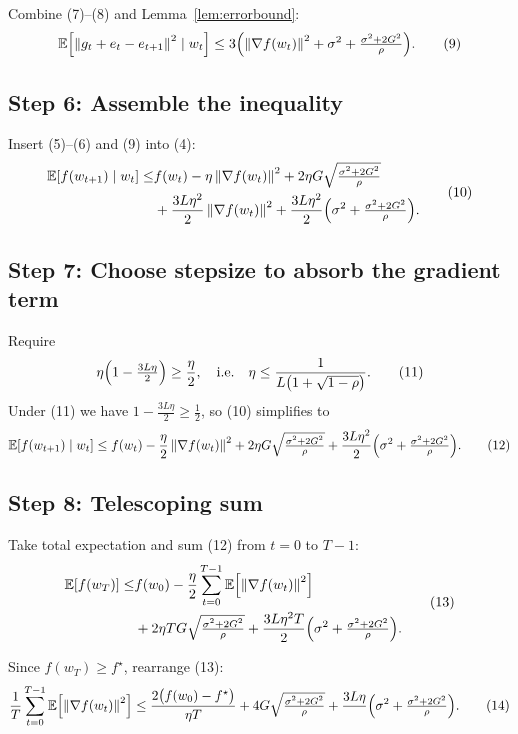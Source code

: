 \documentclass{article}
\newcommand{\EE}{\mathbb{E}}
\newcommand{\norm}[1]{\left\lVert #1 \right\rVert}
\begin{document}
Combine (7)–(8) and Lemma~\ref{lem:errorbound}:
\[
\EE\!\left[\norm{g_t+e_t-e_{t+1}}^{2}\mid w_t\right]
\le 3\Bigl(\norm{\nabla f(w_t)}^{2}+\sigma^{2}
+\tfrac{\sigma^{2}+2G^{2}}{\rho}\Bigr). \tag{9}
\]

\subsection*{Step 6: Assemble the inequality}
Insert (5)–(6) and (9) into (4):
\[
\begin{aligned}
\EE\!\left[f(w_{t+1})\mid w_t\right]
\le&
f(w_t)-\eta\norm{\nabla f(w_t)}^{2}
+2\eta G\sqrt{\tfrac{\sigma^{2}+2G^{2}}{\rho}}\\
&+\frac{3L\eta^{2}}{2}\norm{\nabla f(w_t)}^{2}
+\frac{3L\eta^{2}}{2}\Bigl(\sigma^{2}+\tfrac{\sigma^{2}+2G^{2}}{\rho}\Bigr).
\end{aligned}
\tag{10}
\]

\subsection*{Step 7: Choose stepsize to absorb the gradient term}
Require
\[
\eta\Bigl(1-\tfrac{3L\eta}{2}\Bigr)\ge\frac{\eta}{2},
\quad\text{i.e.}\quad
\eta\le\frac{1}{L\bigl(1+\sqrt{1-\rho}\bigr)}.
\tag{11}
\]
Under (11) we have $1-\frac{3L\eta}{2}\ge\frac{1}{2}$, so (10) simplifies to
\[
\EE\!\left[f(w_{t+1})\mid w_t\right]
\le f(w_t)-\frac{\eta}{2}\norm{\nabla f(w_t)}^{2}
+2\eta G\sqrt{\tfrac{\sigma^{2}+2G^{2}}{\rho}}
+\frac{3L\eta^{2}}{2}\Bigl(\sigma^{2}+\tfrac{\sigma^{2}+2G^{2}}{\rho}\Bigr). \tag{12}
\]

\subsection*{Step 8: Telescoping sum}
Take total expectation and sum (12) from $t=0$ to $T-1$:
\[
\begin{aligned}
\EE[f(w_T)]\le&
f(w_0)-\frac{\eta}{2}\sum_{t=0}^{T-1}\EE\!\left[\norm{\nabla f(w_t)}^{2}\right] \\
&+2\eta T G\sqrt{\tfrac{\sigma^{2}+2G^{2}}{\rho}}
+\frac{3L\eta^{2}T}{2}\Bigl(\sigma^{2}+\tfrac{\sigma^{2}+2G^{2}}{\rho}\Bigr).
\end{aligned}
\tag{13}
\]

Since $f(w_T)\ge f^{\star}$, rearrange (13):
\[
\frac{1}{T}\sum_{t=0}^{T-1}\EE\!\left[\norm{\nabla f(w_t)}^{2}\right]
\le
\frac{2\bigl(f(w_0)-f^{\star}\bigr)}{\eta T}
+4G\sqrt{\tfrac{\sigma^{2}+2G^{2}}{\rho}}
+\frac{3L\eta}{\;}\Bigl(\sigma^{2}+\tfrac{\sigma^{2}+2G^{2}}{\rho}\Bigr). \tag{14}
\]
\end{document}
